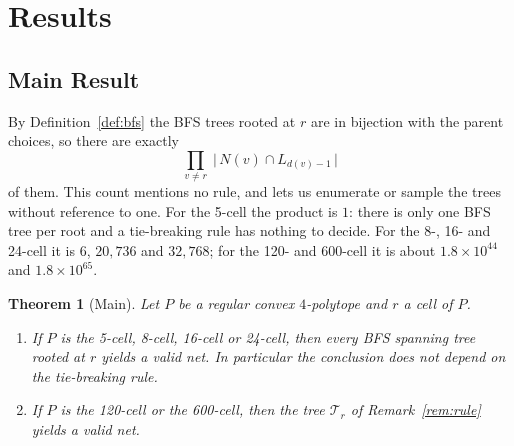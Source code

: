 \documentclass[11pt,letterpaper]{article}
\newtheorem{theorem}{Theorem}
\begin{document}
\section{Results}\label{sec:results}

\subsection{Main Result}

By Definition~\ref{def:bfs} the BFS trees rooted at $r$ are in
bijection with the parent choices, so there are exactly
\[
  \prod_{v\neq r}\;\bigl|\,N(v)\cap L_{d(v)-1}\,\bigr|
\]
of them.
This count mentions no rule, and lets us enumerate or sample the trees
without reference to one.
For the 5-cell the product is $1$: there is only one BFS tree per root
and a tie-breaking rule has nothing to decide.
For the 8-, 16- and 24-cell it is $6$, $20{,}736$ and $32{,}768$; for
the 120- and 600-cell it is about $1.8\times10^{44}$ and
$1.8\times10^{65}$.

\begin{theorem}[Main]\label{thm:main}
Let $P$ be a regular convex $4$-polytope and $r$ a cell of $P$.
\begin{enumerate}
\item If $P$ is the 5-cell, 8-cell, 16-cell or 24-cell, then
  \emph{every} BFS spanning tree rooted at $r$ yields a valid net.
  In particular the conclusion does not depend on the tie-breaking
  rule.
\item If $P$ is the 120-cell or the 600-cell, then the tree $\mathcal{T}_r$ of
  Remark~\ref{rem:rule} yields a valid net.
\end{enumerate}
\end{theorem}
\end{document}
